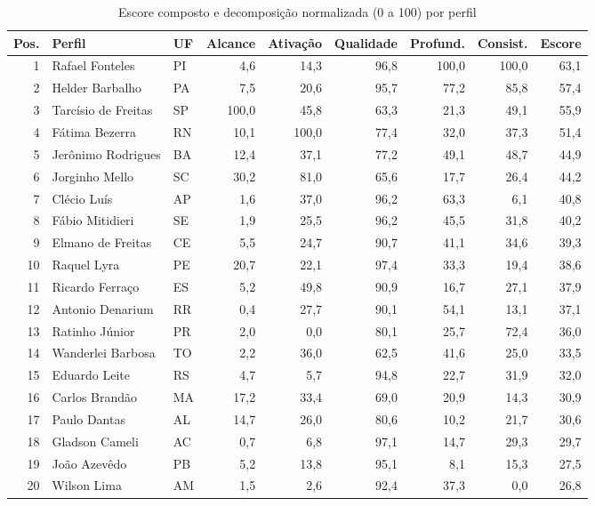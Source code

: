 \begin{table}[htb]
\centering
\caption{Escore composto e decomposição normalizada (0 a 100) por perfil}
\label{tab:scorecard}
\footnotesize\setlength{\tabcolsep}{4pt}
\begin{tabular}{rllrrrrrr}
\toprule
\textbf{Pos.} & \textbf{Perfil} & \textbf{UF} & \textbf{Alcance} & \textbf{Ativação} & \textbf{Qualidade} & \textbf{Profund.} & \textbf{Consist.} & \textbf{Escore} \\
\midrule
1 & Rafael Fonteles & PI & 4,6 & 14,3 & 96,8 & 100,0 & 100,0 & 63,1 \\
2 & Helder Barbalho & PA & 7,5 & 20,6 & 95,7 & 77,2 & 85,8 & 57,4 \\
3 & Tarcísio de Freitas & SP & 100,0 & 45,8 & 63,3 & 21,3 & 49,1 & 55,9 \\
4 & Fátima Bezerra & RN & 10,1 & 100,0 & 77,4 & 32,0 & 37,3 & 51,4 \\
5 & Jerônimo Rodrigues & BA & 12,4 & 37,1 & 77,2 & 49,1 & 48,7 & 44,9 \\
6 & Jorginho Mello & SC & 30,2 & 81,0 & 65,6 & 17,7 & 26,4 & 44,2 \\
7 & Clécio Luís & AP & 1,6 & 37,0 & 96,2 & 63,3 & 6,1 & 40,8 \\
8 & Fábio Mitidieri & SE & 1,9 & 25,5 & 96,2 & 45,5 & 31,8 & 40,2 \\
9 & Elmano de Freitas & CE & 5,5 & 24,7 & 90,7 & 41,1 & 34,6 & 39,3 \\
10 & Raquel Lyra & PE & 20,7 & 22,1 & 97,4 & 33,3 & 19,4 & 38,6 \\
11 & Ricardo Ferraço & ES & 5,2 & 49,8 & 90,9 & 16,7 & 27,1 & 37,9 \\
12 & Antonio Denarium & RR & 0,4 & 27,7 & 90,1 & 54,1 & 13,1 & 37,1 \\
13 & Ratinho Júnior & PR & 2,0 & 0,0 & 80,1 & 25,7 & 72,4 & 36,0 \\
14 & Wanderlei Barbosa & TO & 2,2 & 36,0 & 62,5 & 41,6 & 25,0 & 33,5 \\
15 & Eduardo Leite & RS & 4,7 & 5,7 & 94,8 & 22,7 & 31,9 & 32,0 \\
16 & Carlos Brandão & MA & 17,2 & 33,4 & 69,0 & 20,9 & 14,3 & 30,9 \\
17 & Paulo Dantas & AL & 14,7 & 26,0 & 80,6 & 10,2 & 21,7 & 30,6 \\
18 & Gladson Cameli & AC & 0,7 & 6,8 & 97,1 & 14,7 & 29,3 & 29,7 \\
19 & João Azevêdo & PB & 5,2 & 13,8 & 95,1 & 8,1 & 15,3 & 27,5 \\
20 & Wilson Lima & AM & 1,5 & 2,6 & 92,4 & 37,3 & 0,0 & 26,8 \\

\end{tabular}
\end{table}
